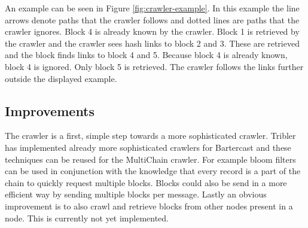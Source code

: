 An example can be seen in Figure \ref{fig:crawler-example}.
In this example the line arrows denote paths that the crawler follows
and dotted lines are paths that the crawler ignores.
Block 4 is already known by the crawler.
Block 1 is retrieved by the crawler and the crawler sees hash links to block 2 and 3.
These are retrieved and the block finds links to block 4 and 5.
Because block 4 is already known, block 4 is ignored.
Only block 5 is retrieved.
The crawler follows the links further outside the displayed example.

\subsection{Improvements}
The crawler is a first, simple step towards a more sophisticated crawler.
Tribler has implemented already more sophisticated crawlers for Bartercast
and these techniques can be reused for the MultiChain crawler.
For example bloom filters can be used in conjunction with the knowledge
that every record is a part of the chain to quickly request multiple blocks\cite{broder-bloomfilter}\cite{logiotatidis-splash}.
Blocks could also be send in a more efficient way by sending multiple blocks per message.
Lastly an obvious improvement is to also crawl and retrieve blocks from other nodes present in a node.
This is currently not yet implemented.



